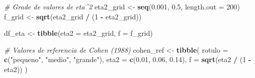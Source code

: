 \documentclass[
]{article}
\newenvironment{Shaded}{\begin{snugshade}}{\end{snugshade}}
\newcommand{\AttributeTok}[1]{\textcolor[rgb]{0.13,0.29,0.53}{#1}}
\newcommand{\CommentTok}[1]{\textcolor[rgb]{0.56,0.35,0.01}{\textit{#1}}}
\newcommand{\DecValTok}[1]{\textcolor[rgb]{0.00,0.00,0.81}{#1}}
\newcommand{\FloatTok}[1]{\textcolor[rgb]{0.00,0.00,0.81}{#1}}
\newcommand{\FunctionTok}[1]{\textcolor[rgb]{0.13,0.29,0.53}{\textbf{#1}}}
\newcommand{\NormalTok}[1]{#1}
\newcommand{\OtherTok}[1]{\textcolor[rgb]{0.56,0.35,0.01}{#1}}
\newcommand{\SpecialCharTok}[1]{\textcolor[rgb]{0.81,0.36,0.00}{\textbf{#1}}}
\newcommand{\StringTok}[1]{\textcolor[rgb]{0.31,0.60,0.02}{#1}}
\begin{document}
\begin{Shaded}
\begin{Highlighting}[]
\CommentTok{\# Grade de valores de eta\^{}2}
\NormalTok{eta2\_grid }\OtherTok{\textless{}{-}} \FunctionTok{seq}\NormalTok{(}\FloatTok{0.001}\NormalTok{, }\FloatTok{0.5}\NormalTok{, }\AttributeTok{length.out =} \DecValTok{200}\NormalTok{)}
\NormalTok{f\_grid }\OtherTok{\textless{}{-}} \FunctionTok{sqrt}\NormalTok{(eta2\_grid }\SpecialCharTok{/}\NormalTok{ (}\DecValTok{1} \SpecialCharTok{{-}}\NormalTok{ eta2\_grid))}

\NormalTok{df\_eta }\OtherTok{\textless{}{-}} \FunctionTok{tibble}\NormalTok{(}\AttributeTok{eta2 =}\NormalTok{ eta2\_grid, }\AttributeTok{f =}\NormalTok{ f\_grid)}

\CommentTok{\# Valores de referencia de Cohen (1988)}
\NormalTok{cohen\_ref }\OtherTok{\textless{}{-}} \FunctionTok{tibble}\NormalTok{(}
  \AttributeTok{rotulo =} \FunctionTok{c}\NormalTok{(}\StringTok{"pequeno"}\NormalTok{, }\StringTok{"medio"}\NormalTok{, }\StringTok{"grande"}\NormalTok{),}
  \AttributeTok{eta2   =} \FunctionTok{c}\NormalTok{(}\FloatTok{0.01}\NormalTok{, }\FloatTok{0.06}\NormalTok{, }\FloatTok{0.14}\NormalTok{),}
  \AttributeTok{f      =} \FunctionTok{sqrt}\NormalTok{(eta2 }\SpecialCharTok{/}\NormalTok{ (}\DecValTok{1} \SpecialCharTok{{-}}\NormalTok{ eta2))}
\NormalTok{)}


\end{Highlighting}
\end{Shaded}
\end{document}
